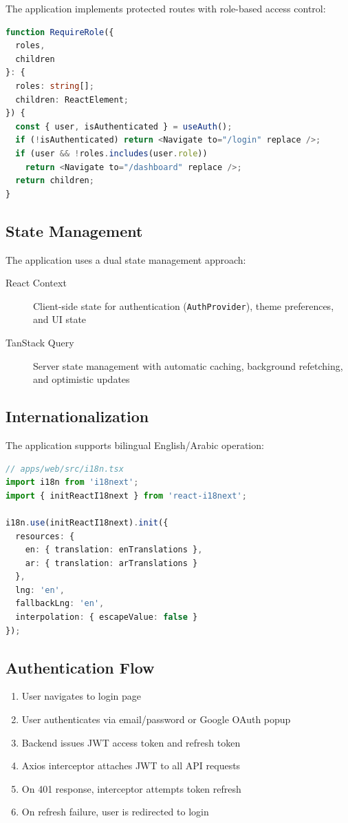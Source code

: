 The application implements protected routes with role-based access control:

\begin{lstlisting}[language=TypeScript, caption=Protected Route Implementation]
function RequireRole({
  roles,
  children
}: {
  roles: string[];
  children: ReactElement;
}) {
  const { user, isAuthenticated } = useAuth();
  if (!isAuthenticated) return <Navigate to="/login" replace />;
  if (user && !roles.includes(user.role))
    return <Navigate to="/dashboard" replace />;
  return children;
}
\end{lstlisting}

\subsection{State Management}

The application uses a dual state management approach:

\begin{description}
  \item[React Context] Client-side state for authentication (\texttt{AuthProvider}), theme preferences, and UI state
  \item[TanStack Query] Server state management with automatic caching, background refetching, and optimistic updates
\end{description}

\subsection{Internationalization}

The application supports bilingual English/Arabic operation:

\begin{lstlisting}[language=TypeScript, caption=i18n Configuration]
// apps/web/src/i18n.tsx
import i18n from 'i18next';
import { initReactI18next } from 'react-i18next';

i18n.use(initReactI18next).init({
  resources: {
    en: { translation: enTranslations },
    ar: { translation: arTranslations }
  },
  lng: 'en',
  fallbackLng: 'en',
  interpolation: { escapeValue: false }
});
\end{lstlisting}

\subsection{Authentication Flow}

\begin{enumerate}
  \item User navigates to login page
  \item User authenticates via email/password or Google OAuth popup
  \item Backend issues JWT access token and refresh token
  \item Axios interceptor attaches JWT to all API requests
  \item On 401 response, interceptor attempts token refresh
  \item On refresh failure, user is redirected to login
\end{enumerate}

